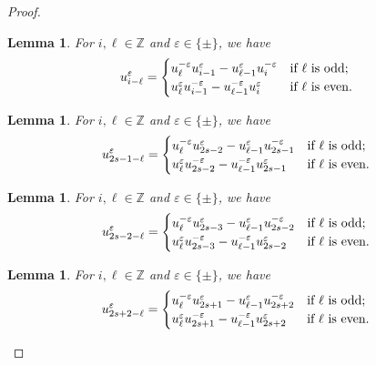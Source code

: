 \documentclass{amsart}
\newtheorem{lemma}[theorem]{Lemma}
\numberwithin{theorem}{section}
\newcommand{\ZZ}{\mathbb{Z}}
\begin{document}
\begin{proof}
  \begin{lemma}
    For $i,\ell\in\ZZ$ and $\varepsilon\in\{\pm\}$, we have
    \begin{equation}
      \label{eq:long Chebyshev recursion}
      u_{i-\ell}^\varepsilon=\begin{cases} u_{\ell}^{-\varepsilon} u_{i-1}^\varepsilon-u_{\ell-1}^\varepsilon u_i^{-\varepsilon} & \text{\upshape if $\ell$ is odd;}\\ u_{\ell}^\varepsilon u_{i-1}^{-\varepsilon}-u_{\ell-1}^{-\varepsilon} u_i^\varepsilon & \text{\upshape if $\ell$ is even.} \end{cases}
    \end{equation}
  \end{lemma}
  \begin{lemma}
    For $i,\ell\in\ZZ$ and $\varepsilon\in\{\pm\}$, we have
    \begin{equation}
      \label{eq:long Chebyshev recursion 1}
      u_{2s-1-\ell}^\varepsilon=\begin{cases} u_{\ell}^{-\varepsilon} u_{2s-2}^\varepsilon-u_{\ell-1}^\varepsilon u_{2s-1}^{-\varepsilon} & \text{\upshape if $\ell$ is odd;}\\ u_{\ell}^\varepsilon u_{2s-2}^{-\varepsilon}-u_{\ell-1}^{-\varepsilon} u_{2s-1}^\varepsilon & \text{\upshape if $\ell$ is even.} \end{cases}
    \end{equation}
  \end{lemma}
  \begin{lemma}
    For $i,\ell\in\ZZ$ and $\varepsilon\in\{\pm\}$, we have
    \begin{equation}
      \label{eq:long Chebyshev recursion 2}
      u_{2s-2-\ell}^\varepsilon=\begin{cases} u_{\ell}^{-\varepsilon} u_{2s-3}^\varepsilon-u_{\ell-1}^\varepsilon u_{2s-2}^{-\varepsilon} & \text{\upshape if $\ell$ is odd;}\\ u_{\ell}^\varepsilon u_{2s-3}^{-\varepsilon}-u_{\ell-1}^{-\varepsilon} u_{2s-2}^\varepsilon & \text{\upshape if $\ell$ is even.} \end{cases}
    \end{equation}
  \end{lemma}
  \begin{lemma}
    For $i,\ell\in\ZZ$ and $\varepsilon\in\{\pm\}$, we have
    \begin{equation}
      \label{eq:long Chebyshev recursion 2}
      u_{2s+2-\ell}^\varepsilon=\begin{cases} u_{\ell}^{-\varepsilon} u_{2s+1}^\varepsilon-u_{\ell-1}^\varepsilon u_{2s+2}^{-\varepsilon} & \text{\upshape if $\ell$ is odd;}\\ u_{\ell}^\varepsilon u_{2s+1}^{-\varepsilon}-u_{\ell-1}^{-\varepsilon} u_{2s+2}^\varepsilon & \text{\upshape if $\ell$ is even.} \end{cases}
    \end{equation}
  \end{lemma}
  \end{proof}
\end{document}
